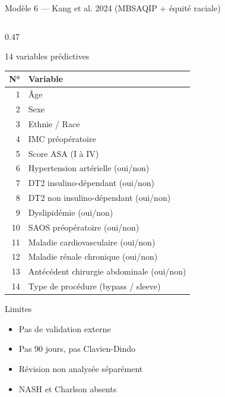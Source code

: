 \documentclass[aspectratio=169]{beamer}
\newcommand{\tightlist}{%
  \setlength{\itemsep}{1pt}\setlength{\parskip}{0pt}%
  \setlength{\parsep}{0pt}\setlength{\topsep}{2pt}}
\begin{document}
\begin{frame}[shrink=5]{Modèle 6 --- Kang et al. 2024 (MBSAQIP + équité raciale)}
\begin{columns}[T]
\begin{column}{0.47\textwidth}
\begin{block}{14 variables prédictives}
        \begin{tabular}{rl}
          \toprule
          \textbf{N°} & \textbf{Variable} \\
          \midrule
          1  & Âge \\
          2  & Sexe \\
          3  & Ethnie / Race \\
          4  & IMC préopératoire \\
          5  & Score ASA (I à IV) \\
          6  & Hypertension artérielle (oui/non) \\
          7  & DT2 insulino-dépendant (oui/non) \\
          8  & DT2 non insulino-dépendant (oui/non) \\
          9  & Dyslipidémie (oui/non) \\
          10 & SAOS préopératoire (oui/non) \\
          11 & Maladie cardiovasculaire (oui/non) \\
          12 & Maladie rénale chronique (oui/non) \\
          13 & Antécédent chirurgie abdominale (oui/non) \\
          14 & Type de procédure (bypass / sleeve) \\
          \bottomrule
        \end{tabular}
      \end{block}
      \vspace{0.15em}
      \begin{alertblock}{Limites}
        \footnotesize\tightlist
        \begin{itemize}\tightlist
          \item Pas de validation externe
          \item Pas 90 jours, pas Clavien-Dindo
          \item Révision non analysée séparément
          \item NASH et Charlson absents
        \end{itemize}
      \end{alertblock}
    \end{column}
  \end{columns}
\end{frame}
\end{document}

